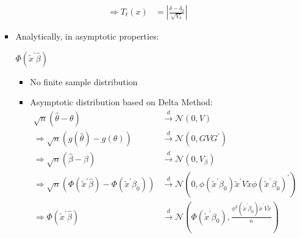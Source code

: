 \begin{enumerate}
\begin{itemize}
\begin{itemize}
\begin{align*}
                    \Rightarrow T_t(x) &= \left\vert \frac{\delta - \delta_0}{\sqrt{V_{\delta}} } \right\vert 
                \end{align*}
            \item Analytically, in asymptotic properties:
                \begin{eg}
                    $\Phi (\tilde{x}^{\prime} \hat{\beta})$
                    \begin{itemize}
                        \item No finite sample distribution
                        \item Asymptotic distribution based on Delta Method:
                        \begin{align*}
                            \sqrt{n}(\hat{\theta} - \theta) &\xrightarrow{d} \mathcal{N}(0, V) \\
                            \Rightarrow \sqrt{n} \left(g(\hat{\theta}) - g(\theta)\right) &\xrightarrow{d} \mathcal{N}(0, G V G^{\prime}) \\
                            \Rightarrow \sqrt{n}(\hat{\beta} - \beta ) &\xrightarrow{d} \mathcal{N}(0, V_{\beta}) \\
                            \Rightarrow \sqrt{n}\left(\Phi(\tilde{x}^{\prime} \hat{\beta}) - \Phi(\tilde{x}^{\prime} \beta_0) \right) &\xrightarrow{d} \mathcal{N}\left(0, \phi(\tilde{x}^{\prime} \beta_0) \tilde{x}^{\prime} V \tilde{x} \phi(\tilde{x}^{\prime} \beta_0)^{\prime} \right) \\
                            \Rightarrow \Phi(\tilde{x}^{\prime} \hat{\beta}) &\xrightarrow{d} \mathcal{N}\left(\Phi(\tilde{x}^{\prime} \beta_0), \frac{\phi^{2}(\tilde{x}^{\prime} \beta_0) \tilde{x}^{\prime} V \tilde{x}}{n}\right)
                        \end{align*}
                    \end{itemize}
                \end{eg}
                \begin{eg}
                    \


\end{eg}
\end{itemize}
\end{itemize}
\end{enumerate}
